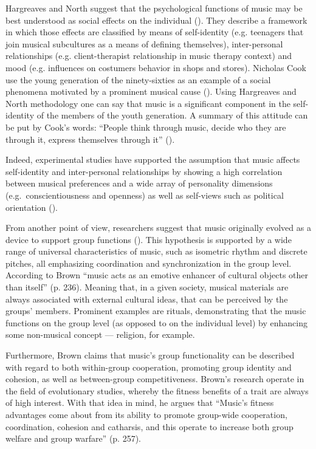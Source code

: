 \documentclass[a4paper,11pt]{article}
\begin{document}
Hargreaves and North suggest that the psychological functions of music may be best understood as social effects on the individual (\cite*{hargreaves99}).
They describe a framework in which those effects are classified by means of self-identity (e.g. teenagers that join musical subcultures as a means of defining themselves), inter-personal relationships (e.g. client-therapist relationship in music therapy context) and mood (e.g. influences on costumers behavior in shops and stores).
Nicholas Cook use the young generation of the ninety-sixties as an example of a social phenomena motivated by a prominent musical cause (\cite*[p. 5]{cook00}).
Using Hargreaves and North methodology one can say that music is a significant component in the self-identity of the members of the youth generation.
A summary of this attitude can be put by Cook's words: ``People think through music, decide who they are through it, express themselves through it'' (\cite*{cook00}).

Indeed, experimental studies have supported the assumption that music affects self-identity and inter-personal relationships by showing a high correlation between musical preferences and a wide array of personality dimensions (e.g.\ conscientiousness and openness) as well as self-views such as political orientation (\cite{rentfrow03}).

From another point of view, researchers suggest that music originally evolved as a device to support group functions (\cite{Brown2000}).
This hypothesis is supported by a wide range of universal characteristics of music, such as isometric rhythm and discrete pitches, all emphasizing coordination and synchronization in the group level.
According to Brown ``music acts as an emotive enhancer of cultural objects other than itself'' (p. 236).
Meaning that, in a given society, musical materials are always associated with external cultural ideas, that can be perceived by the groups' members.
Prominent examples are rituals, demonstrating that the music functions on the group level (as opposed to on the individual level) by enhancing some non-musical concept ---  religion, for example.

Furthermore, Brown claims that music's group functionality can be described with regard to both within-group cooperation, promoting group identity and cohesion, as well as between-group competitiveness.
Brown's research operate in the field of evolutionary studies, whereby the fitness benefits of a trait are always of high interest.
With that idea in mind, he argues that ``Music's fitness advantages come about from its ability to promote group-wide cooperation, coordination, cohesion and catharsis, and this operate to increase both group welfare and group warfare'' (p. 257).
\end{document}
